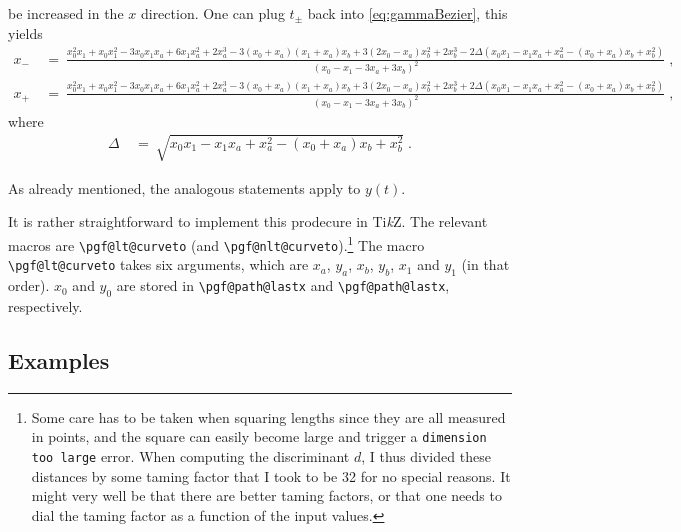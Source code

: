 \documentclass{article}
\begin{document}
be increased in the $x$ direction. One can plug $t_\pm$ back into
\eqref{eq:gammaBezier}, this yields
\begin{subequations}
\begin{align}
x_-&~=~\frac{x_0^2x_1 + x_0x_1^2 - 3x_0x_1x_a + 6x_1x_a^2 + 
  2x_a^3 - 3(x_0 + x_a)(x_1 + x_a)x_b + 
  3(2x_0 - x_a)x_b^2 + 2x_b^3 - 
  2\Delta(x_0x_1 - x_1x_a + x_a^2 - (x_0 + x_a)x_b + 
    x_b^2)}{(x_0 - x_1 - 3x_a + 3x_b)^2}\;,\\
x_+&~=~\frac{x_0^2x_1 + x_0x_1^2 - 3x_0x_1x_a + 6x_1x_a^2 + 
  2x_a^3 - 3(x_0 + x_a)(x_1 + x_a)x_b + 
  3(2x_0 - x_a)x_b^2 + 2x_b^3 + 
  2\Delta(x_0x_1 - x_1x_a + x_a^2 - (x_0 + x_a)x_b + 
    x_b^2)}{(x_0 - x_1 - 3x_a + 3x_b)^2}\;,
\end{align}
\end{subequations}
where
\begin{align}
\Delta&~=~\sqrt{x_0x_1 - x_1x_a + x_a^2 - (x_0 + x_a)x_b + x_b^2}\;.
\end{align}



As already mentioned, the analogous
statements apply to $y(t)$. 

It is rather straightforward to implement this
prodecure in Ti\emph{k}Z. The relevant macros are \verb|\pgf@lt@curveto| (and
\verb|\pgf@nlt@curveto|).\footnote{Some care has to be taken when squaring
lengths since they are all measured in points, and the square can easily become
large and trigger a \texttt{dimension too large} error. When computing the
discriminant $d$, I thus divided these distances by some taming factor that I
took to be 32 for no special reasons. It might very well be that there are
better taming factors, or that one needs to dial the taming factor as a function
of the input values.} The macro \verb|\pgf@lt@curveto| takes six arguments,
which are $x_a$, $y_a$, $x_b$, $y_b$, $x_1$ and $y_1$ (in that order). $x_0$ and
$y_0$ are stored in \verb|\pgf@path@lastx| and \verb|\pgf@path@lastx|,
respectively.

\subsection*{Examples}
\end{document}
